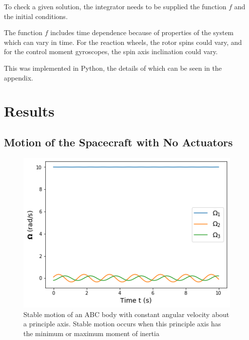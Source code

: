 \documentclass[12]{article}
\begin{document}
\begin{multicols*}{2}
To check a given solution, the integrator needs to be supplied the function $f$ and the initial conditions.

The function $f$ includes time dependence because of properties of the system which can vary in time. For the reaction wheels, the rotor spins could vary, and for the control moment gyroscopes, the spin axis inclination could vary.

This was implemented in Python, the details of which can be seen in the appendix.

\vfill\null
\columnbreak

\section{Results}

\subsection{Motion of the Spacecraft with No Actuators}

\begin{figure}[H]
\centering
\includegraphics[width=0.9\linewidth]{fig/no_actuation_ABC_stable.png}
\vspace{-0.3cm}
\caption{\label{fig:no_actuation_ABC_stable}Stable motion of an ABC body with constant angular velocity about a principle axis. Stable motion occurs when this principle axis has the minimum or maximum moment of inertia}
\end{figure}


\end{multicols*}
\end{document}
